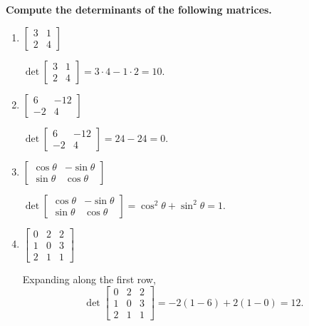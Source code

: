 \providecommand{\rank}{\operatorname{r}}
\providecommand{\RR}{\mathbb R}
\providecommand{\CC}{\mathbb C}
\providecommand{\KK}{\mathbb K}

\setcounter{enumi}{40}
\item {\bfseries\boldmath
Compute the determinants of the following matrices.
}

\begin{enumerate}[label=\alph*)]

\item $\begin{bmatrix}3&1\\2&4\end{bmatrix}$

\begin{answer}
$\det\begin{bmatrix}3&1\\2&4\end{bmatrix}=3\cdot4-1\cdot2=10$.
\end{answer}

\item $\begin{bmatrix}6&-12\\-2&4\end{bmatrix}$

\begin{answer}
$\det\begin{bmatrix}6&-12\\-2&4\end{bmatrix}=24-24=0$.
\end{answer}

\item $\begin{bmatrix}\cos\theta&-\sin\theta\\\sin\theta&\cos\theta\end{bmatrix}$

\begin{answer}
$\det\begin{bmatrix}\cos\theta&-\sin\theta\\\sin\theta&\cos\theta\end{bmatrix}
=\cos^2\theta+\sin^2\theta=1$.
\end{answer}

\item $\begin{bmatrix}0&2&2\\1&0&3\\2&1&1\end{bmatrix}$

\begin{answer}
Expanding along the first row,
\[
 \det\begin{bmatrix}0&2&2\\1&0&3\\2&1&1\end{bmatrix}
 =-2(1-6)+2(1-0)=12.
\]
\end{answer}
\end{enumerate}
